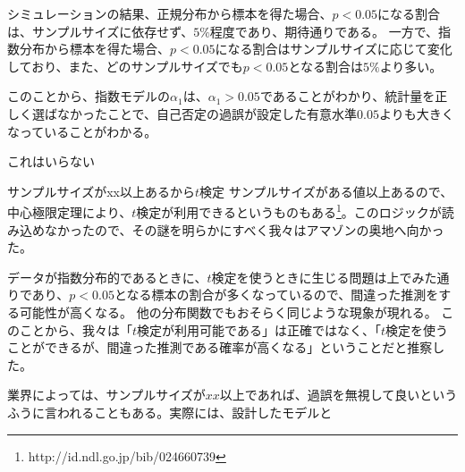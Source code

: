 シミュレーションの結果、正規分布から標本を得た場合、$p<0.05$になる割合は、サンプルサイズに依存せず、$5\%$程度であり、期待通りである。
一方で、指数分布から標本を得た場合、$p<0.05$になる割合はサンプルサイズに応じて変化しており、また、どのサンプルサイズでも$p<0.05$となる割合は$5\%$より多い。

このことから、指数モデルの$\alpha_1$は、$\alpha_1>0.05$であることがわかり、統計量を正しく選ばなかったことで、自己否定の過誤が設定した有意水準$0.05$よりも大きくなっていることがわかる。

これはいらない
\begin{SMbox}{サンプルサイズがxx以上あるから$t$検定}
        サンプルサイズがある値以上あるので、中心極限定理により、$t$検定が利用できるというものもある\footnote{http://id.ndl.go.jp/bib/024660739}。このロジックが読み込めなかったので、その謎を明らかにすべく我々はアマゾンの奥地へ向かった。

        データが指数分布的であるときに、$t$検定を使うときに生じる問題は上でみた通りであり、$p<0.05$となる標本の割合が多くなっているので、間違った推測をする可能性が高くなる。
        他の分布関数でもおそらく同じような現象が現れる。
        このことから、我々は「$t$検定が利用可能である」は正確ではなく、「$t$検定を使うことができるが、間違った推測である確率が高くなる」ということだと推察した。

        業界によっては、サンプルサイズが$xx$以上であれば、過誤を無視して良いというふうに言われることもある。実際には、設計したモデルと
\end{SMbox}
\fi

